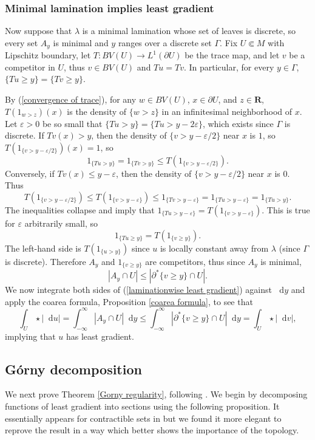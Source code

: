 \documentclass[reqno,10pt]{amsart}
\newcommand{\RR}{\mathbf{R}}
\newcommand*\dif{\mathop{}\!\mathrm{d}}
\theoremstyle{definition}
\numberwithin{equation}{section}
\begin{document}
\subsubsection{Minimal lamination implies least gradient}
Now suppose that $\lambda$ is a minimal lamination whose set of leaves is discrete, so every set $A_y$ is minimal and $y$ ranges over a discrete set $\Gamma$.
Fix $U \Subset M$ with Lipschitz boundary, let $T: BV(U) \to L^1(\partial U)$ be the trace map, and let $v$ be a competitor in $U$, thus $v \in BV(U)$ and $Tu = Tv$.
In particular, for every $y \in \Gamma$, $\{Tu \geq y\} = \{Tv \geq y\}$.

By (\ref{convergence of trace}), for any $w \in BV(U)$, $x \in \partial U$, and $z \in \RR$, $T(1_{w > z})(x)$ is the density of $\{w > z\}$ in an infinitesimal neighborhood of $x$.
Let $\varepsilon > 0$ be so small that $\{Tu > y\} = \{Tu > y - 2\varepsilon\}$, which exists since $\Gamma$ is discrete.
If $Tv(x) > y$, then the density of $\{v > y - \varepsilon/2\}$ near $x$ is $1$, so $T(1_{\{v > y - \varepsilon/2\}})(x) = 1$, so 
$$1_{\{Tu > y\}} = 1_{\{Tv > y\}} \leq T(1_{\{v > y - \varepsilon/2\}}).$$
Conversely, if $Tv(x) \leq y - \varepsilon$, then the density of $\{v > y - \varepsilon/2\}$ near $x$ is $0$. Thus 
$$T(1_{\{v > y - \varepsilon/2\}}) \leq T(1_{\{v > y - \varepsilon\}}) \leq 1_{\{Tv > y - \varepsilon\}} = 1_{\{Tu > y - \varepsilon\}} = 1_{\{Tu > y\}}.$$
The inequalities collapse and imply that $1_{\{Tu > y - \varepsilon\}} = T(1_{\{v > y - \varepsilon\}})$.
This is true for $\varepsilon$ arbitrarily small, so
$$1_{\{Tu \geq y\}} = T(1_{\{v \geq y\}}).$$
The left-hand side is $T(1_{\{u > y\}})$ since $u$ is locally constant away from $\lambda$ (since $\Gamma$ is discrete).
Therefore $A_y$ and $1_{\{v \geq y\}}$ are competitors, thus since $A_y$ is minimal, 
\begin{equation}\label{laminationwise least gradient}
|A_y \cap U| \leq |\partial^* \{v \geq y\} \cap U|.
\end{equation}
We now integrate both sides of (\ref{laminationwise least gradient}) against $\dif y$ and apply the coarea formula, Proposition \ref{coarea formula}, to see that
$$\int_U \star |\dif u| = \int_{-\infty}^\infty |A_y \cap U| \dif y \leq \int_{-\infty}^\infty |\partial^* \{v \geq y\} \cap U| \dif y = \int_U \star |\dif v|,$$
    implying that $u$ has least gradient.

\subsection{G\'orny decomposition}
We next prove Theorem \ref{Gorny regularity}, following \cite[\S3]{górny2017planar}.
We begin by decomposing functions of least gradient into sections using the following proposition.
It essentially appears for contractible sets in \cite[pg10-11]{górny2017planar} but we found it more elegant to reprove the result in a way which better shows the importance of the topology.
\end{document}

